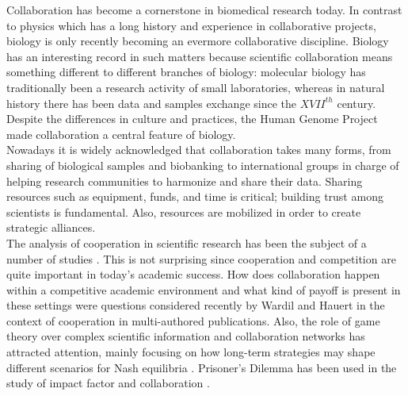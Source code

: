 \documentclass[11pt]{article}
\begin{document}


  

Collaboration has become a cornerstone in biomedical research today.
In contrast to physics which has a long history and experience in
collaborative projects, biology is only recently becoming an evermore
collaborative discipline\cite{Vermeulen2013}. Biology has an
interesting record in such matters because scientific collaboration
means something different to different branches of biology: molecular
biology has traditionally been a research activity of small
laboratories\cite{KnorrCetina1999,Strasser2006}, whereas in natural
history there has been data and samples exchange since the $XVII^{th}$
century\cite{Muller2012,Strasser2012}. Despite the differences in
culture and practices, the Human Genome Project made collaboration a
central feature of biology.\\


Nowadays it is widely acknowledged that collaboration takes many
forms, from sharing of biological samples and biobanking to
international groups in charge of helping research communities to
harmonize and share their data. Sharing resources such as equipment,
funds, and time is critical; building trust among scientists is
fundamental. Also, resources are mobilized in order to create strategic alliances.\\


The analysis of cooperation in scientific research has been the subject of a
number of studies
\cite{Vermeulen2013,Newman2001,Newman2004,Elango2012,HernandezLemus2013,Strasser2006,Strasser2012}. This
is not surprising since cooperation and competition are quite important in
today's academic success. How does collaboration happen within a competitive
academic environment and what kind of payoff is present in these settings were
questions considered recently by Wardil and Hauert \cite{Wardil2015} in the
context of cooperation in multi-authored publications. Also, the role of game
theory over complex scientific information and collaboration networks has
attracted attention, mainly focusing on how long-term strategies may shape
different scenarios for Nash equilibria \cite{hanauske2012}. Prisoner's Dilemma
has been used in the study of impact factor and collaboration
\cite{Hara_etal_2002,Lieberman_etal_2005}. \\  
\end{document}
